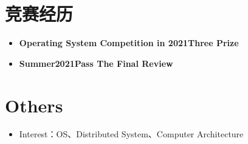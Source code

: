 \documentclass{cv}
\begin{document}
\section{竞赛经历}
\begin{itemize}
  \item \textbf{Operating System Competition in 2021}\quad \textbf{Three Prize}
  \item \textbf{Summer2021}\quad \textbf{Pass The Final Review}
\end{itemize}

\section{Others}
\begin{itemize}
  \item Interest：OS、Distributed System、Computer Architecture
\end{itemize}
\end{document}

